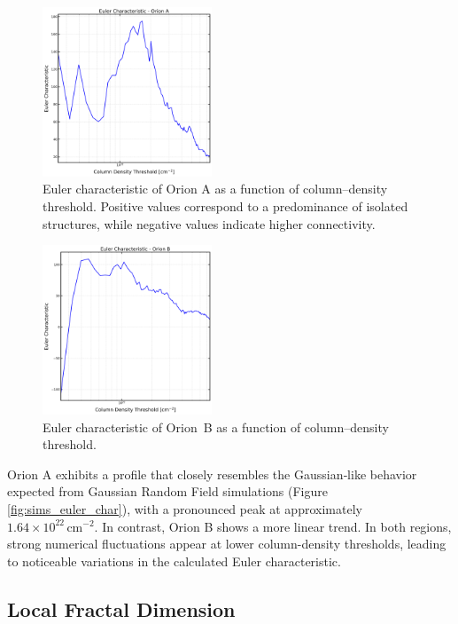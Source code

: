 \begin{figure}[t]
    \centering
    \includegraphics[width=0.45\textwidth]{figures/euler_Orion_A_no_figs.png}
    \caption{Euler characteristic of Orion A as a function of column–density threshold. Positive values correspond to a predominance of isolated structures, while negative values indicate higher connectivity.}
    \label{fig:Euler_Orion_A_no_figs}
\end{figure}

\begin{figure}[t]
    \centering
    \includegraphics[width=0.45\textwidth]{figures/euler_Orion_B_no_figs.png}
    \caption{Euler characteristic of Orion~B as a function of column–density threshold.}
    \label{fig:Euler_Orion_B_no_figs}
\end{figure}

Orion A exhibits a profile that closely resembles the Gaussian‑like behavior expected from Gaussian Random Field simulations (Figure \ref{fig:sims_euler_char}), with a pronounced peak at approximately $1.64 \times 10^{22} \,\mathrm{cm}^{-2}$. In contrast, Orion B shows a more linear trend. In both regions, strong numerical fluctuations appear at lower column-density thresholds, leading to noticeable variations in the calculated Euler characteristic.

\subsection{Local Fractal Dimension}

